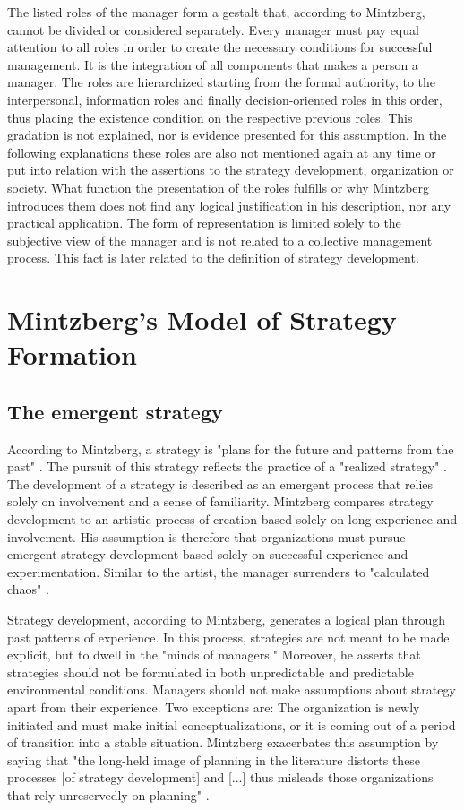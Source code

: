 \documentclass[a4paper,12pt]{article}
\begin{document}
The listed roles of the manager form a gestalt that, according to Mintzberg,
cannot be divided or considered separately. Every manager must pay equal
attention to all roles in order to create the necessary conditions for
successful management. It is the integration of all components that makes a
person a manager. The roles are hierarchized starting from the formal
authority, to the interpersonal, information roles and finally
decision-oriented roles in this order, thus placing the existence condition on
the respective previous roles. This gradation is not explained, nor is
evidence presented for this assumption. In the following explanations these
roles are also not mentioned again at any time or put into relation with the
assertions to the strategy development, organization or society. What function
the presentation of the roles fulfills or why Mintzberg introduces them does
not find any logical justification in his description, nor any practical
application. The form of representation is limited solely to the subjective
view of the manager and is not related to a collective management
process. This fact is later related to the definition of strategy development.

\section{Mintzberg's Model of Strategy Formation}

\subsection{The emergent strategy}

According to Mintzberg, a strategy is "plans for the future and patterns from
the past" \cite[p. 41]{Mintzberg}. The pursuit of this strategy reflects the
practice of a "realized strategy" \cite[p. 41]{Mintzberg}. The development of
a strategy is described as an emergent process that relies solely on
involvement and a sense of familiarity. Mintzberg compares strategy
development to an artistic process of creation based solely on long experience
and involvement. His assumption is therefore that organizations must pursue
emergent strategy development based solely on successful experience and
experimentation. Similar to the artist, the manager surrenders to "calculated
chaos" \cite[p. 40]{Mintzberg}.

Strategy development, according to Mintzberg, generates a logical plan through
past patterns of experience. In this process, strategies are not meant to be
made explicit, but to dwell in the "minds of managers." Moreover, he asserts
that strategies should not be formulated in both unpredictable and predictable
environmental conditions. Managers should not make assumptions about strategy
apart from their experience. Two exceptions are: The organization is newly
initiated and must make initial conceptualizations, or it is coming out of a
period of transition into a stable situation. Mintzberg exacerbates this
assumption by saying that "the long-held image of planning in the literature
distorts these processes [of strategy development] and [...] thus misleads
those organizations that rely unreservedly on planning"
\cite[p. 42]{Mintzberg}.
\end{document}

